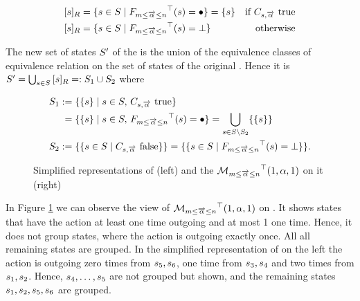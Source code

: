 \documentclass[preview]{standalone}
\begin{document}
\begin{align*}
	\eqclassv &= \{\state \in \states \mid \gfctspanoutaction(\state) = \remelem\} = \{\state\} &\text{if } \formoutact \text{ true} \\
	\eqclassv &= \{\state \in \states \mid \gfctspanoutaction(\state) = \notppty\} &\text{ otherwise}	
\end{align*}

The new set of states ${S}'$ of the \viewN \viewspanoutaction is the union of the equivalence classes of equivalence relation \eqrelview on the set of states \states of the original \chgphN. Hence it is ${S}' = \bigcup_{{s} \in {S}} {{[{s}]_{{R}}}} =: {S}_1 \cup {S}_2$ where

\begin{align*}
	\states_1 &:= \{\{\state\} \mid \state \in \states, \, \formoutact \text{ true}\} \\
	&\;= \{\{\state\} \mid \state \in \states, \, \gfctspanoutaction(\state) = \remelem\} = \nogroupstates \\
	\states_2 &:= \{\{\state \in \states  \mid \formoutact \text{ false}\}\} = \{\{\state \in \states \mid \gfctspanoutaction(\state) = \notppty\}\}.
\end{align*}

\begin{figure}[h]
	\begin{minipage}{.5\textwidth}
		\hspace{5mm}
		
	\end{minipage}%
	\begin{minipage}{.5\textwidth}
		\hspace{5mm}
		
	\end{minipage}
	\caption{Simplified representations of \mdp (left) and the \viewN ${{{{{\mathcal{M}}}}_{{{m}\leq{\overrightarrow{\ensuremath{{\alpha}}}}\leq{n}}}}^{\top}}(1, {\alpha}, 1)$ on it (right)}
	\label{fig:outActSpan}
\end{figure}

In Figure \ref{fig:outActSpan} we can observe the view of ${{{{{\mathcal{M}}}}_{{{m}\leq{\overrightarrow{\ensuremath{{\alpha}}}}\leq{n}}}}^{\top}}(1, {\alpha}, 1)$ on \mdp. It shows states that have the action \action at least one time outgoing and at most 1 one time. Hence, it does not group states, where the action \action is outgoing exactly once. All all remaining states are grouped. In the simplified representation of \achgphN on the left the action \action is outgoing zero times from ${s}_5, {s}_6$, one time from ${s}_3, {s}_4$ and two times from ${s}_1, {s}_2$. Hence, ${s}_4, \dots, {s}_5$ are not grouped but shown, and the remaining states ${s}_1, {s}_2, {s}_5, {s}_6$ are grouped.
\end{document}
